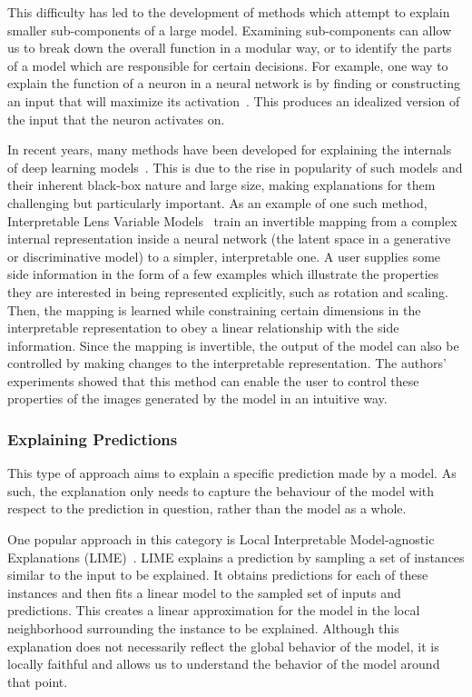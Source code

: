 \documentclass[graybox]{svmult}
\begin{document}
This difficulty has led to the development of methods 
which attempt to explain smaller sub-components of a large model. 
Examining sub-components can allow us to break down the overall function in a modular way, 
or to identify the parts of a model which are responsible for certain decisions. 
For example, one way to explain the function of a neuron in a neural network is 
by finding or constructing an input that will maximize 
its activation~\cite{mahendranVisualizingDeepConvolutional2016}. 
This produces an idealized version of the input that the neuron activates on.
 
In recent years, many methods have been developed for explaining 
the internals of deep learning models~\cite{samekExplainingDeepNeural2021}. 
This is due to the rise in popularity of such models and their inherent black-box nature and large size, 
making explanations for them challenging but particularly important. 
As an example of one such method, 
Interpretable Lens Variable Models~\cite{adelDiscoveringInterpretableRepresentations2018} 
train an invertible mapping from a complex internal representation inside a neural network 
(the latent space in a generative or discriminative model) to a simpler, interpretable one. 
A user supplies some side information in the form of a few examples which illustrate the properties they are interested in being represented explicitly, such as rotation and scaling. Then, the mapping is learned while constraining certain dimensions in the interpretable representation to obey a linear relationship with the side information. Since the mapping is invertible, the output of the model can also be controlled by making changes to the interpretable representation. The authors' experiments showed that this method can enable the user to control these properties of the images generated by the model in an intuitive way.

\subsubsection{Explaining Predictions}

This type of approach aims to explain a specific prediction made by a model. 
As such, the explanation only needs to capture the behaviour of the model 
with respect to the prediction in question, rather than the model as a whole.

One popular approach in this category is 
Local Interpretable Model-agnostic Explanations (LIME)~\cite{expPredict_Ribeiro_KDD_16}. 
LIME explains a prediction by sampling a set of instances similar to the input to be explained. 
It obtains predictions for each of these instances and then fits a linear model to the sampled set of inputs and predictions. This creates a linear approximation for the model 
in the local neighborhood surrounding the instance to be explained. 
Although this explanation does not necessarily reflect the global behavior of the model, 
it is locally faithful and allows us to understand the behavior of the model around that point.
\end{document}
